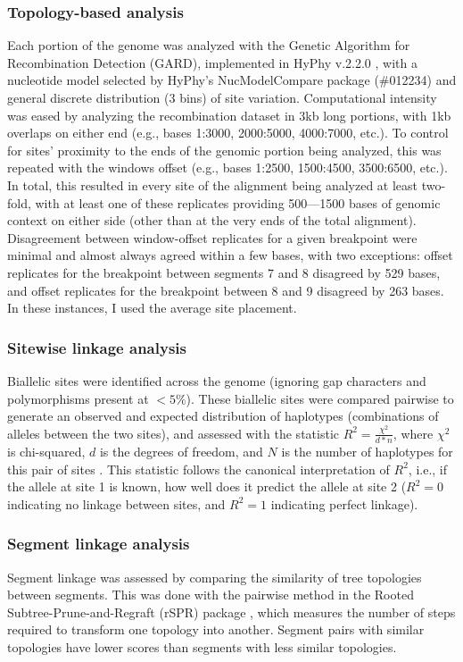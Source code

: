 \subsubsection*{Topology-based analysis}
Each portion of the genome was analyzed with the Genetic Algorithm for Recombination Detection (GARD), implemented in HyPhy v.2.2.0 \citep{kosakovsky2006gard}, with a nucleotide model selected by HyPhy’s NucModelCompare package (\#012234) and general discrete distribution (3 bins) of site variation.
Computational intensity was eased by analyzing the recombination dataset in 3kb long portions, with 1kb overlaps on either end (e.g., bases 1:3000, 2000:5000, 4000:7000, etc.).
To control for sites' proximity to the ends of the genomic portion being analyzed, this was repeated with the windows offset (e.g., bases 1:2500, 1500:4500, 3500:6500, etc.).
In total, this resulted in every site of the alignment being analyzed at least two-fold, with at least one of these replicates providing 500---1500 bases of genomic context on either side (other than at the very ends of the total alignment).
Disagreement between window-offset replicates for a given breakpoint were minimal and almost always agreed within a few bases, with two exceptions: offset replicates for the breakpoint between segments 7 and 8 disagreed by 529 bases, and offset replicates for the breakpoint between 8 and 9 disagreed by 263 bases.
In these instances, I used the average site placement.

\subsubsection*{Sitewise linkage analysis}
Biallelic sites were identified across the genome (ignoring gap characters and polymorphisms present at $<5\%$).
These biallelic sites were compared pairwise to generate an observed and expected distribution of haplotypes (combinations of alleles between the two sites), and assessed with the statistic $R^2=\frac{\chi^2}{d*n}$, where $\chi^2$ is chi-squared, $d$ is the degrees of freedom, and $N$ is the number of haplotypes for this pair of sites \citep{hill1968linkage}.
This statistic follows the canonical interpretation of $R^2$, i.e., if the allele at site 1 is known, how well does it predict the allele at site 2 ($R^2 = 0$ indicating no linkage between sites, and $R^2 = 1$ indicating perfect linkage).

\subsubsection*{Segment linkage analysis}
Segment linkage was assessed by comparing the similarity of tree topologies between segments.
This was done with the pairwise method in the Rooted Subtree-Prune-and-Regraft (rSPR) package \citep{whidden2017ricci}, which measures the number of steps required to transform one topology into another.
Segment pairs with similar topologies have lower scores than segments with less similar topologies.

